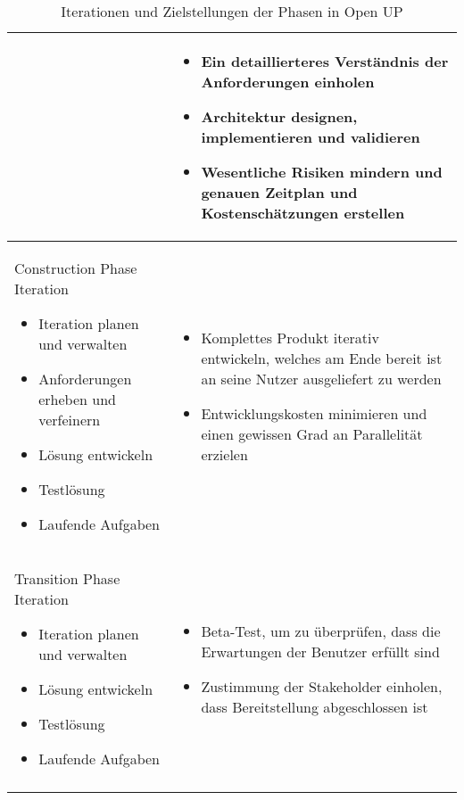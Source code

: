 \begin{longtable}{|p{7cm}|p{8cm}|}
  & 
     \begin {itemize}
   \item Ein detaillierteres Verständnis der Anforderungen einholen
   \item Architektur designen, implementieren und validieren
   \item  Wesentliche Risiken mindern und genauen Zeitplan und Kostenschätzungen erstellen
    \end{itemize}
 \\
\hline
\hline
Construction Phase Iteration 
   \begin {itemize}
   \item Iteration planen und verwalten
   \item Anforderungen erheben und verfeinern
     \item Lösung entwickeln
   \item Testlösung
   \item Laufende Aufgaben

\end{itemize}

&
   \begin {itemize}
\item Komplettes Produkt iterativ entwickeln, welches am Ende bereit ist an seine Nutzer ausgeliefert zu werden
\item Entwicklungskosten minimieren und einen gewissen Grad an Parallelität erzielen 
\end{itemize}

 \\
\hline
Transition Phase Iteration 

   \begin {itemize}

 \item Iteration planen und verwalten
     \item Lösung entwickeln
   \item Testlösung
   \item Laufende Aufgaben

 \end{itemize}

 
  &
  
     \begin {itemize}
      \item Beta-Test, um zu überprüfen, dass die Erwartungen der Benutzer erfüllt sind 
     \item Zustimmung der Stakeholder einholen, dass Bereitstellung abgeschlossen ist
      \end{itemize}

\\

\hline

\caption{Iterationen und Zielstellungen der Phasen in Open UP \cite{eclipseopenup}}
\label{tab:tab1}
\end{longtable}






